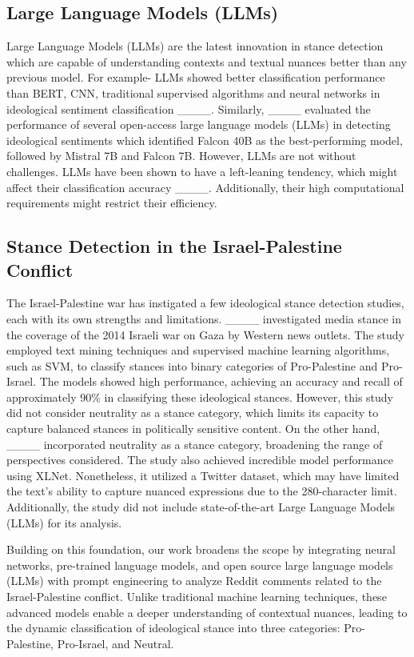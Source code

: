 \subsection*{\textbf{Large Language Models (LLMs)}}
Large Language Models (LLMs) are the latest innovation in stance detection which are capable of understanding contexts and textual nuances better than any previous model. For example- LLMs showed better classification performance than BERT, CNN, traditional supervised algorithms and neural networks in ideological sentiment classification ____. Similarly, ____ evaluated the performance of several open-access large language models (LLMs) in detecting ideological sentiments which identified Falcon 40B as the best-performing model, followed by Mistral 7B and Falcon 7B. However, LLMs are not without challenges. LLMs have been shown to have a left-leaning tendency, which might affect their classification accuracy ____. Additionally, their high computational requirements might restrict their efficiency. 

\subsection*{\textbf{Stance Detection in the Israel-Palestine Conflict}}
The Israel-Palestine war has instigated a few ideological stance detection studies, each with its own strengths and limitations. ____ investigated media stance in the coverage of the 2014 Israeli war on Gaza by Western news outlets. The study employed text mining techniques and supervised machine learning algorithms, such as SVM, to classify stances into binary categories of Pro-Palestine and Pro-Israel. The models showed high performance, achieving an accuracy and recall of approximately 90\% in classifying these ideological stances. However, this study did not consider neutrality as a stance category, which limits its capacity to capture balanced stances in politically sensitive content. On the other hand, ____ incorporated neutrality as a stance category, broadening the range of perspectives considered. The study also achieved incredible model performance using XLNet. Nonetheless, it utilized a Twitter dataset, which may have limited the text's ability to capture nuanced expressions due to the 280-character limit. Additionally, the study did not include state-of-the-art Large Language Models (LLMs) for its analysis.

Building on this foundation, our work broadens the scope by integrating neural networks, pre-trained language models, and open source large language models (LLMs) with prompt engineering to analyze Reddit comments related to the Israel-Palestine conflict. Unlike traditional machine learning techniques, these advanced models enable a deeper understanding of contextual nuances, leading to the dynamic classification of ideological stance into three categories: Pro-Palestine, Pro-Israel, and Neutral.